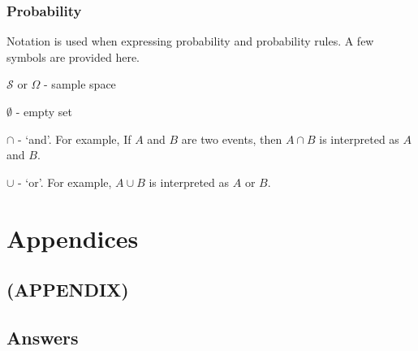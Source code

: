 \documentclass[
  oneside]{krantz}
\begin{document}
\hypertarget{probability-2}{%
\section{Probability}\label{probability-2}}

Notation is used when expressing probability and probability rules. A few symbols are provided here.

\(\mathcal{S}\) or \(\Omega\) - sample space

\(\emptyset\) - empty set

\(\cap\) - `and'. For example, If \(A\) and \(B\) are two events, then \(A \cap B\) is interpreted as \(A\) and \(B\).

\(\cup\) - `or'. For example, \(A \cup B\) is interpreted as \(A\) or \(B\).

\hypertarget{part-appendices}{%
\part{Appendices}\label{part-appendices}}

\hypertarget{appendix}{%
\chapter*{(APPENDIX)}\label{appendix}}


\hypertarget{answers-1}{%
\chapter{Answers}\label{answers-1}}

  

\printindex
\end{document}

